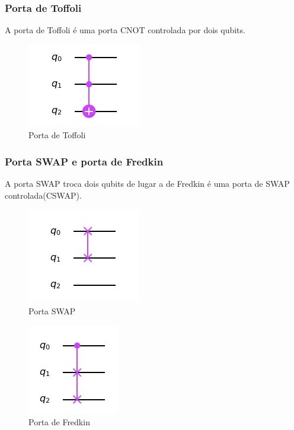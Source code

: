 \documentclass[12pt,a4paper]{article}
\begin{document}
\subsubsection{Porta de Toffoli}
A porta de Toffoli é uma porta CNOT controlada por dois qubits.

\begin{figure}[h!]
    \centering
    \includegraphics{Toffoli_gate.png}
    
        \caption{Porta de Toffoli}
    \label{fig:TFgate}
\end{figure}


\subsubsection{Porta SWAP e porta de Fredkin}
A porta SWAP troca dois qubits de lugar a de Fredkin é uma porta de SWAP controlada(CSWAP).

\begin{figure}[h]
    \centering
    \includegraphics{porta_swap_simbolo.png}
    
        \caption{Porta SWAP}
    \label{fig:swapgate}
\end{figure}


\begin{figure}[h]
    \centering
    \includegraphics{fredkin_simbolo.png}
    
        \caption{Porta de Fredkin}
    \label{fig:frdgate}
\end{figure}
\end{document}
